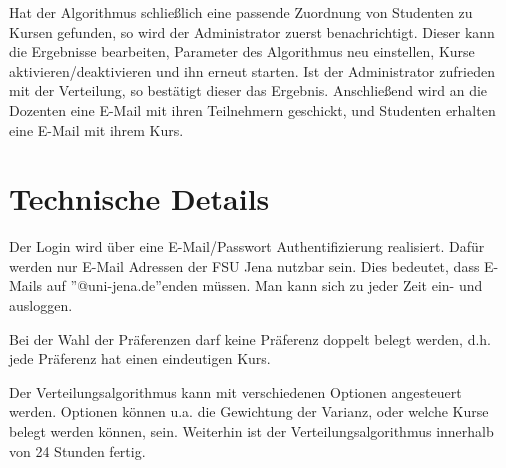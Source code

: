 Hat der Algorithmus schließlich eine passende Zuordnung von Studenten zu Kursen gefunden, so wird der Administrator zuerst benachrichtigt.
Dieser kann die Ergebnisse bearbeiten, Parameter des Algorithmus neu einstellen, Kurse aktivieren/deaktivieren und ihn erneut starten.
Ist der Administrator zufrieden mit der Verteilung, so bestätigt dieser das Ergebnis.
Anschließend wird an die Dozenten eine E-Mail mit ihren Teilnehmern geschickt, und Studenten erhalten eine E-Mail mit ihrem Kurs.

\section{Technische Details}
Der Login wird über eine E-Mail/Passwort Authentifizierung realisiert.
Dafür werden nur E-Mail Adressen der FSU Jena nutzbar sein. Dies bedeutet, dass E-Mails auf ''@uni-jena.de''enden müssen.
Man kann sich zu jeder Zeit ein- und ausloggen.\newline

Bei der Wahl der Präferenzen darf keine Präferenz doppelt belegt werden, d.h. jede Präferenz hat einen eindeutigen Kurs. \newline %

Der Verteilungsalgorithmus kann mit verschiedenen Optionen angesteuert werden. Optionen können u.a. die Gewichtung der Varianz, oder welche Kurse belegt werden können, sein. Weiterhin ist der Verteilungsalgorithmus innerhalb von 24 Stunden fertig. \newline


